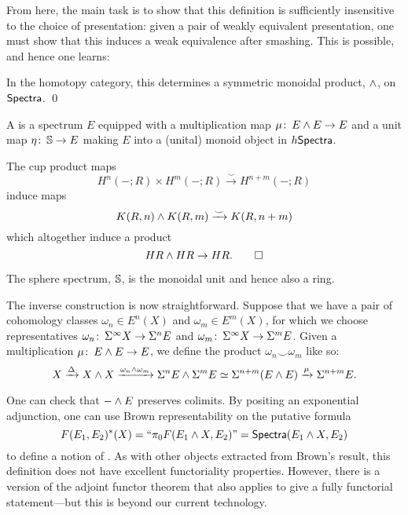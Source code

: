 From here, the main task is to show that this definition is sufficiently insensitive to the choice of presentation: given a pair of weakly equivalent presentation, one must show that this induces a weak equivalence after smashing.
This is possible, and hence one learns:

\begin{theorem}
In the homotopy category, this determines a symmetric monoidal product, $\sm$, on $\CatOf{Spectra}$. \qed
\end{theorem}

\begin{definition}
A  is a spectrum $E$ equipped with a multiplication map $\mu\co E \sm E \to E$ and a unit map $\eta\co \S \to E$ making $E$ into a (unital) monoid object in $h\CatOf{Spectra}$.
\end{definition}

\begin{corollary}
The cup product maps \[H^n(-; R) \times H^m(-; R) \xrightarrow\smile H^{n+m}(-; R)\] induce maps \[K(R, n) \sm K(R, m) \xrightarrow\smile K(R, n+m)\] which altogether induce a product \[HR \sm HR \to HR. \qed\]
\end{corollary}

\begin{example}
The sphere spectrum, $\S$, is the monoidal unit and hence also a ring.
\end{example}

The inverse construction is now straightforward.
Suppose that we have a pair of cohomology classes $\omega_n \in E^n(X)$ and $\omega_m \in E^m(X)$, for which we choose representatives $\omega_n\co \Susp^\infty X \to \Susp^n E$ and $\omega_m\co \Susp^\infty X \to \Susp^m E$.
Given a multiplication $\mu\co E \sm E \to E$, we define the product $\omega_n \smile \omega_m$ like so:
\[X \xrightarrow{\Delta} X \sm X \xrightarrow{\omega_n \sm \omega_m} \Susp^n E \sm \Susp^m E \simeq \Susp^{n+m}(E \sm E) \xrightarrow\mu \Susp^{n+m} E.\]

\begin{remark}
One can check that $- \sm E$ preserves colimits.
By positing an exponential adjunction, one can use Brown representability on the putative formula \[F(E_1, E_2)^*(X) = \text{``}\pi_0 F(E_1 \sm X, E_2)\text{''} = \CatOf{Spectra}(E_1 \sm X, E_2)\] to define a notion of .
As with other objects extracted from Brown's result, this definition does not have excellent functoriality properties.
However, there is a version of the adjoint functor theorem that also applies to give a fully functorial statement---but this is beyond our current technology.
\end{remark}


